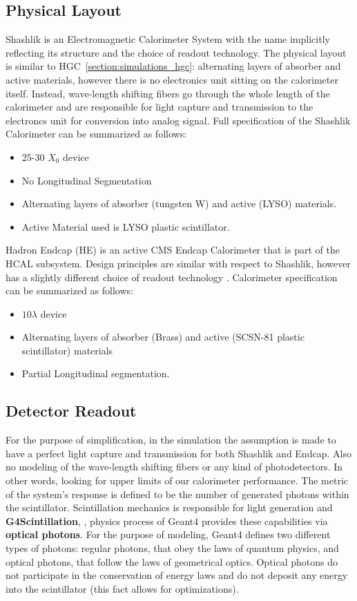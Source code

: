 \subsection{Physical Layout}
Shashlik is an Electromagnetic Calorimeter System with the name implicitly reflecting its structure and the choice of readout technology. The physical layout is similar to HGC~\ref{section:simulations_hgc}: alternating layers of absorber and active materials, however there is no electronics unit sitting on the calorimeter itself. Instead, wave-length shifting fibers go through the whole length of the calorimeter and are responsible for light capture and transmission to the electroncs unit for conversion into analog signal. Full specification of the Shashlik Calorimeter can be summarized as follows:
\begin{itemize}
    \item 25-30 $X_0$ device
    \item No Longitudinal Segmentation
    \item Alternating layers of absorber (tungsten W) and active (LYSO) materials.
    \item Active Material used is LYSO plastic scintillator.
\end{itemize}
Hadron Endcap (HE) is an active CMS Endcap Calorimeter that is part of the HCAL subsystem. Design principles are similar with respect to Shashlik, however has a slightly different choice of readout technology \cite{Baiatian:2008zz}. Calorimeter specification can be summarized as follows:
\begin{itemize}
    \item $10\lambda$ device
    \item Alternating layers of absorber (Brass) and active (SCSN-81 plastic scintillator) materials
    \item Partial Longitudinal segmentation.
\end{itemize}

\subsection{Detector Readout}
For the purpose of simplification, in the simulation the assumption is made to have a perfect light capture and transmission for both Shashlik and Endcap. Also no modeling of the wave-length shifting fibers or any kind of photodetectors. In other words, looking for upper limits of our calorimeter performance. The metric of the system's response is defined to be the number of generated photons within the scintillator. Scintillation mechanics is responsible for light generation and \textbf{G4Scintillation}, \cite{geant4}, physics process of {\sc Geant4} provides these capabilities via \textbf{optical photons}. For the purpose of modeling, {\sc Geant4} defines two different types of photons: regular photons, that obey the laws of quantum physics, and optical photons, that follow the laws of geometrical optics. Optical photons do not participate in the conservation of energy laws and do not deposit any energy into the scintillator (this fact allows for optimizations).

